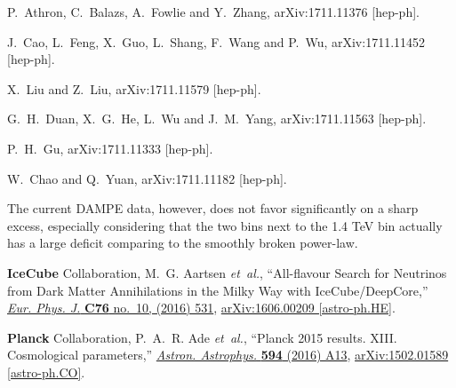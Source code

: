 \documentclass[aps,prd,letterpaper,showpacs,twocolumn,preprintnumbers,floatfix,superscriptaddress]{revtex4-1}
\begin{document}
\begin{thebibliography}{99}
  P.~Athron, C.~Balazs, A.~Fowlie and Y.~Zhang,
  arXiv:1711.11376 [hep-ph].
  
  J.~Cao, L.~Feng, X.~Guo, L.~Shang, F.~Wang and P.~Wu,
  arXiv:1711.11452 [hep-ph].
  
  X.~Liu and Z.~Liu,
  arXiv:1711.11579 [hep-ph].


  
  G.~H.~Duan, X.~G.~He, L.~Wu and J.~M.~Yang,
  arXiv:1711.11563 [hep-ph].
  
  P.~H.~Gu,
  arXiv:1711.11333 [hep-ph].
  
  W.~Chao and Q.~Yuan,
  arXiv:1711.11182 [hep-ph].
  

The current DAMPE data, however, does not favor significantly on a sharp
  excess, especially considering that the two bins next to the 1.4 TeV bin
  actually has a large deficit comparing to the smoothly broken power-law.

{\bfseries IceCube} Collaboration, M.~G. Aartsen {\em et~al.}, ``{All-flavour
  Search for Neutrinos from Dark Matter Annihilations in the Milky Way with
  IceCube/DeepCore},''
  \href{http://dx.doi.org/10.1140/epjc/s10052-016-4375-3}{{\em Eur. Phys. J.}
  {\bfseries C76} no.~10, (2016) 531},
\href{http://arxiv.org/abs/1606.00209}{{\ttfamily arXiv:1606.00209
  [astro-ph.HE]}}.

{\bfseries Planck} Collaboration, P.~A.~R. Ade {\em et~al.}, ``{Planck 2015
  results. XIII. Cosmological parameters},''
  \href{http://dx.doi.org/10.1051/0004-6361/201525830}{{\em Astron. Astrophys.}
  {\bfseries 594} (2016) A13},
\href{http://arxiv.org/abs/1502.01589}{{\ttfamily arXiv:1502.01589
  [astro-ph.CO]}}.


\end{thebibliography}
\end{document}
